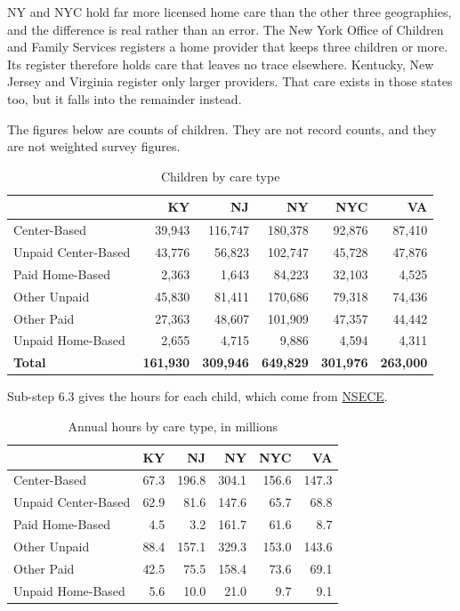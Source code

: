 \documentclass[11pt]{article}
\begin{document}
NY and NYC hold far more licensed home care than the other three geographies,
and the difference is real rather than an error. The New York Office of Children
and Family Services registers a home provider that keeps three children or more.
Its register therefore holds care that leaves no trace elsewhere. Kentucky, New
Jersey and Virginia register only larger providers. That care exists in those
states too, but it falls into the remainder instead.

The figures below are counts of children. They are not record counts, and they
are not weighted survey figures.

\begin{table}[H]
\centering
\caption{Children by care type}
\begin{tabular}{L{4.0cm}rrrrr}
\toprule
& \textbf{KY} & \textbf{NJ} & \textbf{NY} & \textbf{NYC} & \textbf{VA} \\
\midrule
Center-Based        & 39,943 & 116,747 & 180,378 &  92,876 &  87,410 \\
Unpaid Center-Based & 43,776 &  56,823 & 102,747 &  45,728 &  47,876 \\
Paid Home-Based     &  2,363 &   1,643 &  84,223 &  32,103 &   4,525 \\
Other Unpaid        & 45,830 &  81,411 & 170,686 &  79,318 &  74,436 \\
Other Paid          & 27,363 &  48,607 & 101,909 &  47,357 &  44,442 \\
Unpaid Home-Based   &  2,655 &   4,715 &   9,886 &   4,594 &   4,311 \\
\midrule
\textbf{Total}      & \textbf{161,930} & \textbf{309,946} & \textbf{649,829}
                    & \textbf{301,976} & \textbf{263,000} \\
\bottomrule
\end{tabular}
\end{table}

Sub-step 6.3 gives the hours for each child, which come from
\href{https://www.icpsr.umich.edu/web/ICPSR/studies/37941}{NSECE}.

\begin{table}[H]
\centering
\caption{Annual hours by care type, in millions}
\begin{tabular}{L{4.0cm}rrrrr}
\toprule
& \textbf{KY} & \textbf{NJ} & \textbf{NY} & \textbf{NYC} & \textbf{VA} \\
\midrule
Center-Based        & 67.3 & 196.8 & 304.1 & 156.6 & 147.3 \\
Unpaid Center-Based & 62.9 &  81.6 & 147.6 &  65.7 &  68.8 \\
Paid Home-Based     &  4.5 &   3.2 & 161.7 &  61.6 &   8.7 \\
Other Unpaid        & 88.4 & 157.1 & 329.3 & 153.0 & 143.6 \\
Other Paid          & 42.5 &  75.5 & 158.4 &  73.6 &  69.1 \\
Unpaid Home-Based   &  5.6 &  10.0 &  21.0 &   9.7 &   9.1 \\
\bottomrule
\end{tabular}
\end{table}
\end{document}
